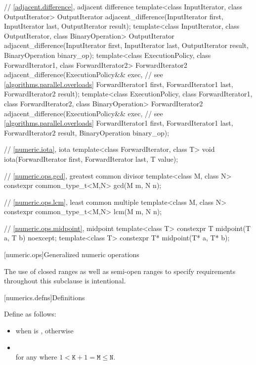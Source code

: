 \begin{codeblock}
{  // \ref{adjacent.difference}, adjacent difference
  template<class InputIterator, class OutputIterator>
    OutputIterator
      adjacent_difference(InputIterator first, InputIterator last,
                          OutputIterator result);
  template<class InputIterator, class OutputIterator, class BinaryOperation>
    OutputIterator
      adjacent_difference(InputIterator first, InputIterator last,
                          OutputIterator result, BinaryOperation binary_op);
  template<class ExecutionPolicy, class ForwardIterator1, class ForwardIterator2>
    ForwardIterator2
      adjacent_difference(ExecutionPolicy&& exec,               // see \ref{algorithms.parallel.overloads}
                          ForwardIterator1 first, ForwardIterator1 last,
                          ForwardIterator2 result);
  template<class ExecutionPolicy, class ForwardIterator1, class ForwardIterator2,
           class BinaryOperation>
    ForwardIterator2
      adjacent_difference(ExecutionPolicy&& exec,               // see \ref{algorithms.parallel.overloads}
                          ForwardIterator1 first, ForwardIterator1 last,
                          ForwardIterator2 result, BinaryOperation binary_op);

  // \ref{numeric.iota}, iota
  template<class ForwardIterator, class T>
    void iota(ForwardIterator first, ForwardIterator last, T value);

  // \ref{numeric.ops.gcd}, greatest common divisor
  template<class M, class N>
    constexpr common_type_t<M,N> gcd(M m, N n);

  // \ref{numeric.ops.lcm}, least common multiple
  template<class M, class N>
    constexpr common_type_t<M,N> lcm(M m, N n);

  // \ref{numeric.ops.midpoint}, midpoint
  template<class T>
    constexpr T midpoint(T a, T b) noexcept;
  template<class T>
    constexpr T* midpoint(T* a, T* b);
}
\end{codeblock}

[numeric.ops]{Generalized numeric operations}

\pnum
\begin{note}
The use of closed ranges as well as semi-open ranges
to specify requirements throughout this subclause is intentional.
\end{note}

[numerics.defns]{Definitions}

%
\pnum
Define 
as follows:
\begin{itemize}
\item
{} when  is , otherwise

\item
{} \\
for any  where $1 < \mathtt{K}+1 = \mathtt{M} \leq \mathtt{N}$.
\end{itemize}

